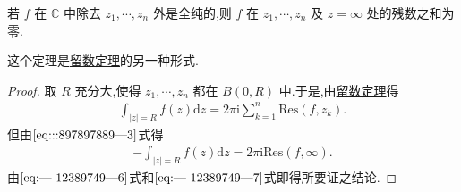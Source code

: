 \documentclass[../../main.tex]{subfiles}
\begin{document}
\begin{theorem}\label{theorem:定理5.4.12}
若 \( f \) 在 \( \mathbb{C} \) 中除去 \( z_1, \cdots, z_n \) 外是全纯的,则 \( f \) 在 \( z_1, \cdots, z_n \) 及 \( z = \infty \) 处的残数之和为零.
\end{theorem}
\begin{remark}
这个定理是\hyperref[theorem:留数定理(残数定理)-定理5.4.9]{留数定理}的另一种形式.
\end{remark}
\begin{proof}
取 \( R \) 充分大,使得 \( z_1, \cdots, z_n \) 都在 \( B(0,R) \) 中.于是,由\hyperref[theorem:留数定理(残数定理)-定理5.4.9]{留数定理}得
\begin{align}
\int_{|z| = R} f(z) \mathrm{d}z = 2\pi \mathrm{i} \sum_{k = 1}^{n} \mathrm{Res}(f, z_k).\label{eq:----12389749---6}
\end{align}
但由\(\eqref{eq:::897897889---3}\)式得
\begin{align}\label{eq:----12389749---7}
- \int_{|z| = R} f(z) \mathrm{d}z = 2\pi \mathrm{i} \mathrm{Res}(f, \infty).
\end{align}
由\(\eqref{eq:----12389749---6}\)式和\(\eqref{eq:----12389749---7}\)式即得所要证之结论.
\end{proof}
\end{document}
